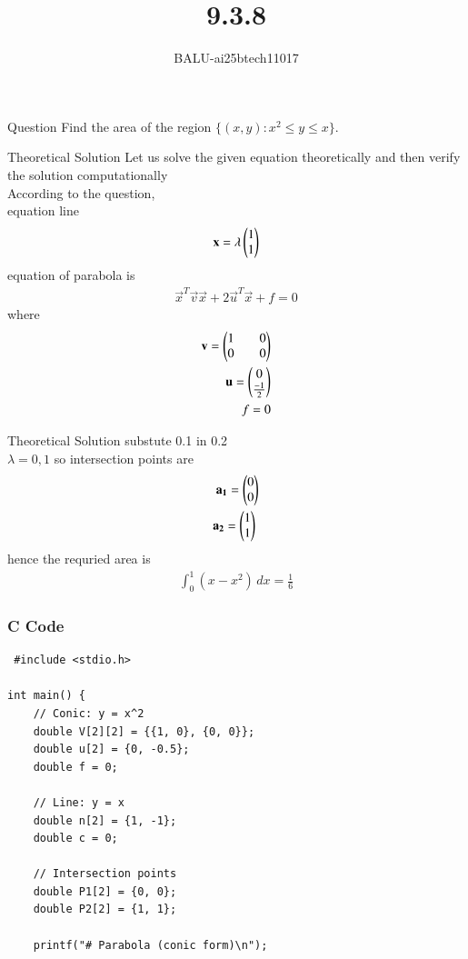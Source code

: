 \documentclass{beamer}
\title %
{9.3.8}
\author %
{BALU-ai25btech11017}
\begin{document}
\frame{\titlepage}
\begin{frame}{Question}
Find the area of the region $\{(x, y) : x^2 \leq y \leq x\}$.
\\ 
\end{frame}
\begin{frame}{Theoretical Solution}
Let us solve the given equation theoretically and then verify the solution computationally \\
According to the question, \\
equation line
\begin{align}
\mathbf{x}=\lambda\begin{pmatrix}1\\1\end{pmatrix}
\end{align}
equation of parabola is
\begin{align}
   \vec{x}^T\vec{v}\vec{x}+2\vec{u}^T\vec{x}+f=0
\end{align}
where
\begin{align}
   \mathbf{v}=\begin{pmatrix}1&&0\\0&&0\end{pmatrix}\\
   \mathbf{u}=\begin{pmatrix}0\\\frac{-1}{2}\end{pmatrix}\\
   f=0
\end{align}
\end{frame}
\begin{frame}{Theoretical Solution}
substute 0.1 in 0.2\\
$\lambda=0,1$ so intersection points are
\begin{align}
   \mathbf{a_1}=\begin{pmatrix}0\\0\end{pmatrix}\\
   \mathbf{a_2}=\begin{pmatrix}1\\1\end{pmatrix}\
\end{align}
hence the requried area is
\begin{align}
    \int_{0}^{1} (x-x^2) \, dx=\frac{1}{6}
\end{align}
\end{frame}
\begin{frame}[fragile]
    \frametitle{C Code}

    \begin{lstlisting}
 #include <stdio.h>

int main() {
    // Conic: y = x^2
    double V[2][2] = {{1, 0}, {0, 0}};
    double u[2] = {0, -0.5};
    double f = 0;

    // Line: y = x
    double n[2] = {1, -1};
    double c = 0;

    // Intersection points
    double P1[2] = {0, 0};
    double P2[2] = {1, 1};

    printf("# Parabola (conic form)\n");
    
    \end{lstlisting}
\end{frame}
\end{document}
